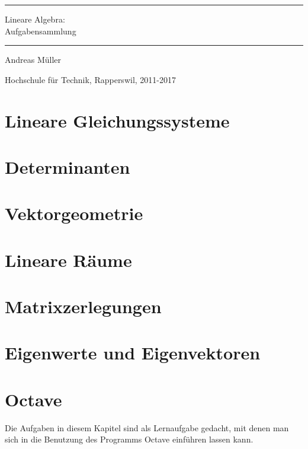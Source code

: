 \documentclass[a4paper,12pt]{book}
\begin{document}
\pagestyle{fancy}
\rhead{}
\frontmatter
\newcommand\HRule{\noindent\rule{\linewidth}{1.5pt}}
\begin{titlepage}
\HRule
\vspace*{2pt}
\begin{flushright}
{\Huge
Lineare Algebra:\\
\bigskip
Aufgabensammlung}
\end{flushright}
\HRule
\begin{flushright}
\vspace{30pt}
\LARGE
Andreas Müller
\end{flushright}
\begin{center}
Hochschule für Technik, Rapperswil, 2011-2017
\end{center}
\end{titlepage}
\tableofcontents
\newenvironment{beispiel}[1][Beispiel]{%
\begin{proof}[#1]%
\renewcommand{\qedsymbol}{$\bigcirc$}
}{\end{proof}}
\mainmatter


\openthemaindex
{}
\allowdisplaybreaks
\chapter{Lineare Gleichungssysteme}

\chapter{Determinanten}

\chapter{Vektorgeometrie}

\chapter{Lineare Räume}

\chapter{Matrixzerlegungen}

\chapter{Eigenwerte und Eigenvektoren}

\chapter{Octave}
Die Aufgaben in diesem Kapitel sind als Lernaufgabe gedacht, mit denen
man sich in die Benutzung des Programms Octave einführen lassen kann.

\bigskip

\closethemaindex

\end{document}
